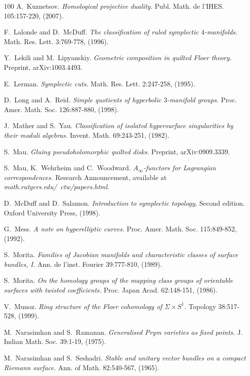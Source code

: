 \documentclass[reqno,10pt]{amsart}
\numberwithin{equation}{section}
\theoremstyle{remark}
\begin{document}
\begin{thebibliography}{100}
A.~Kuznetsov.
\emph{Homological projective duality.}
Publ. Math. de l'IHES. 105:157-220, (2007).

F.~Lalonde and D.~McDuff.
\emph{The classification of ruled symplectic $4$-manifolds.}
Math. Res. Lett. 3:769-778, (1996).


Y.~Lekili and M.~Lipyanskiy.
\emph{Geometric composition in quilted Floer theory.}
Preprint, arXiv:1003.4493.

E.~Lerman.
\emph{Symplectic cuts.}
Math. Res. Lett. 2:247-258, (1995).

D.~Long and A.~Reid.
\emph{Simple quotients of hyperbolic $3$-manifold groups.}
Proc. Amer. Math. Soc. 126:887-880, (1998).

J.~Mather and S.~Yau.
\emph{Classification of isolated hypersurface singularities by their moduli algebras.}
Invent. Math. 69:243-251, (1982).

S.~Mau.
\emph{Gluing pseudoholomorphic quilted disks.}
Preprint, arXiv:0909.3339.


S.~Mau, K.~Wehrheim and C.~Woodward.
\emph{$A_{\infty}$-functors for Lagrangian correspondences.}
Research Announcement, available at \emph{math.rutgers.edu/~ctw/papers.html}.

D.~McDuff and D.~Salamon.
\emph{Introduction to symplectic topology,} Second edition.
Oxford University Press, (1998).



G.~Mess.
\emph{A note on hyperelliptic curves.}
Proc. Amer. Math. Soc. 115:849-852, (1992).

S.~Morita.
\emph{Families of Jacobian manifolds and characteristic classes of surface bundles, I.}
Ann. de l'inst. Fourier 39:777-810, (1989).

S.~Morita.
\emph{On the homology groups of the mapping class groups of orientable surfaces with twisted coefficients.}
Proc. Japan Acad. 62:148-151, (1986).

V.~Munoz.
\emph{Ring structure of the Floer cohomology of $\Sigma\times S^1$.}
Topology 38:517-528, (1999).

M.~Narasimhan and S.~Ramanan.
\emph{Generalised Prym varieties as fixed points.}
J. Indian Math. Soc. 39:1-19, (1975).


M.~Narasimhan and S.~Seshadri.
\emph{Stable and unitary vector bundles on a compact Riemann surface.}
Ann. of Math. 82:540-567, (1965).


\end{thebibliography}
\end{document}
